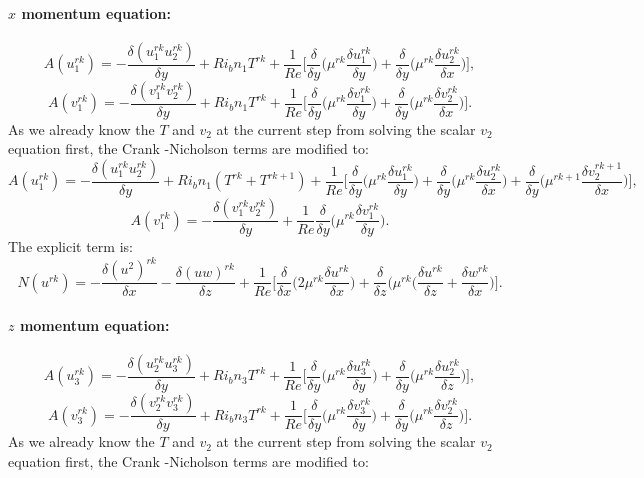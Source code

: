 \documentclass[preprint,12pt]{article}
\begin{document}
\paragraph{$x$ momentum equation:}
\begin{equation}
A(u_1^{rk})=-\frac{\delta (u_1^{rk}u_2^{rk})}{\delta y}+Ri_b n_1{{T}}^{rk}+\frac{1}{Re}\Bigg[\frac{\delta}{\delta y}\Big(\mu^{rk}\frac{\delta u_1^{rk}}{\delta y}\Big)+\frac{\delta }{\delta y}\Big(\mu^{rk}\frac{\delta u_2^{rk}}{\delta x}\Big)\Bigg],
\end{equation}
\begin{equation}
{A}(v_1^{rk})=-\frac{\delta (v_1^{rk}v_2^{rk})}{\delta y}+Ri_b n_1{{T}}^{rk}+\frac{1}{Re}\Bigg[\frac{\delta}{\delta y}\Big(\mu^{rk}\frac{\delta v_1^{rk}}{\delta y}\Big)+\frac{\delta }{\delta y}\Big(\mu^{rk}\frac{\delta v_2^{rk}}{\delta x}\Big)\Bigg].
\end{equation}
As we already know the $T$ and $v_2$ at the current step from solving the scalar $v_2$ equation first, the Crank -Nicholson terms are modified to: 
\begin{equation}
A(u_1^{rk})=-\frac{\delta (u_1^{rk}u_2^{rk})}{\delta y}+Ri_b n_1({{T}}^{rk}+{{T}}^{rk+1})+\frac{1}{Re}\Bigg[\frac{\delta}{\delta y}\Big(\mu^{rk}\frac{\delta u_1^{rk}}{\delta y}\Big)+\frac{\delta }{\delta y}\Big(\mu^{rk}\frac{\delta u_2^{rk}}{\delta x}\Big)+\frac{\delta }{\delta y}\Big(\mu^{rk+1}\frac{\delta v_2^{rk+1}}{\delta x}\Big)\Bigg],
\end{equation}
\begin{equation}
{A}(v_1^{rk})=-\frac{\delta (v_1^{rk}v_2^{rk})}{\delta y}+\frac{1}{Re}\frac{\delta}{\delta y}\Big(\mu^{rk}\frac{\delta v_1^{rk}}{\delta y}\Big).
\end{equation}
The explicit term is: 
\begin{equation}
N(u^{rk})=-\frac{\delta {(u^2)}^{rk}}{\delta x}-\frac{\delta {(uw)}^{rk}}{\delta z} +\frac{1}{Re}\Bigg[\frac{\delta}{\delta x}\Big({2\mu^{rk}}\frac{\delta u^{rk}}{\delta x}\Big)+\frac{\delta }{\delta z}\Big({{\mu^{rk}}}\Big(\frac{\delta u^{rk}}{\delta z}+\frac{\delta w^{rk}}{\delta x} \Big)\Bigg].
\end{equation}

\paragraph{$z$ momentum equation:}
\begin{equation}
A(u_3^{rk})=-\frac{\delta (u_2^{rk}u_3^{rk})}{\delta y}+Ri_b n_3
{{T}}^{rk}+\frac{1}{Re}\Bigg[\frac{\delta}{\delta y}\Big(\mu^{rk}\frac{\delta u_3^{rk}}{\delta y}\Big)+\frac{\delta }{\delta y}\Big(\mu^{rk}\frac{\delta u_2^{rk}}{\delta z}\Big)\Bigg],
\end{equation}
\begin{equation}
{A}(v_3^{rk})=-\frac{\delta (v_2^{rk}v_3^{rk})}{\delta y}+Ri_b n_3
{{T}}^{rk}+\frac{1}{Re}\Bigg[\frac{\delta}{\delta y}\Big(\mu^{rk}\frac{\delta v_3^{rk}}{\delta y}\Big)+\frac{\delta }{\delta y}\Big(\mu^{rk}\frac{\delta v_2^{rk}}{\delta z}\Big)\Bigg].
\end{equation}
As we already know the $T$ and $v_2$ at the current step from solving the scalar $v_2$ equation first, the Crank -Nicholson terms are modified to: 
\end{document}
